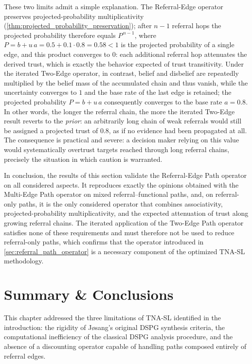 These two limits admit a simple explanation. The Referral-Edge operator preserves projected-probability multiplicativity (\cref{thm:projected_probability_preservation}); after $n-1$ referral hops the projected probability therefore equals $P^{\,n-1}$, where $P = b + u\,a = 0.5 + 0.1 \cdot 0.8 = 0.58 < 1$ is the projected probability of a single edge, and this product converges to $0$: each additional referral hop attenuates the derived trust, which is exactly the behavior expected of trust transitivity. Under the iterated Two-Edge operator, in contrast, belief and disbelief are repeatedly multiplied by the belief mass of the accumulated chain and thus vanish, while the uncertainty converges to $1$ and the base rate of the last edge is retained; the projected probability $P = b + u\,a$ consequently converges to the base rate $a=0.8$. In other words, the longer the referral chain, the more the iterated Two-Edge result reverts to the \emph{prior}: an arbitrarily long chain of weak referrals would still be assigned a projected trust of $0.8$, as if no evidence had been propagated at all. The consequence is practical and severe: a decision maker relying on this value would systematically overtrust targets reached through long referral chains, precisely the situation in which caution is warranted.

In conclusion, the results of this section validate the Referral-Edge Path operator on all considered aspects. It reproduces exactly the opinions obtained with the Multi-Edge Path operator on mixed referral--functional paths, and, on referral-only paths, it is the only considered operator that combines associativity, projected-probability multiplicativity, and the expected attenuation of trust along growing referral chains. The iterated application of the Two-Edge Path operator satisfies none of these requirements and must therefore not be used to reduce referral-only paths, which confirms that the operator introduced in \cref{sec:referral_path_operator} is a necessary component of the optimized \ac{TNA-SL} methodology.


\section{Summary \& Conclusions}
\label{sec:summary_tnsl}

This chapter addressed the three limitations of \ac{TNA-SL} identified in the introduction: the rigidity of J{\o}sang's original \ac{DSPG} synthesis criteria, the computational inefficiency of the classical \ac{DSPG} analysis procedure, and the absence of a discounting operator capable of handling paths composed entirely of referral edges.

